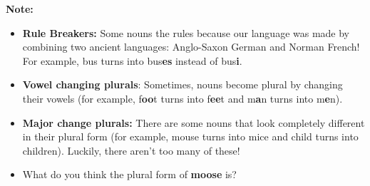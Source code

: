 \documentclass[12pt]{article}
\begin{document}
\vspace{1em}
\begin{tcolorbox}[colframe=black!40, colback=gray!5, 
coltitle=black, colbacktitle=black!20, fonttitle=\bfseries\Large, 
title=Additional Notes, halign title=center, left=5pt, right=5pt, top=5pt, bottom=15pt]
\textbf{Note:}
\begin{itemize}
    \item \textbf{Rule Breakers:} Some nouns the rules because our language was made by combining two ancient languages: Anglo-Saxon German and Norman French!  For example, bus turns into bus\textbf{es} instead of bus\textbf{i}.
    \item \textbf{Vowel changing plurals}: Sometimes, nouns become plural by changing their vowels (for example, f\textbf{oo}t turns into f\textbf{ee}t and m\textbf{a}n turns into m\textbf{e}n).
    \item \textbf{Major change plurals:} There are some nouns that look completely different in their plural form (for example, mouse turns into mice and child turns into children). Luckily, there aren't too many of these!


\end{itemize}
\end{tcolorbox}

\vspace{1em}

\begin{tcolorbox}[colframe=black!60, colback=white, 
coltitle=black, colbacktitle=black!15, fonttitle=\bfseries\Large, 
title=Exit Ticket, halign title=center, left=10pt, right=10pt, top=10pt, bottom=15pt]

\begin{itemize}
    \item What do you think the plural form of \textbf{moose} is?

\vspace{8em}

\end{itemize}
\end{tcolorbox}
\end{document}
